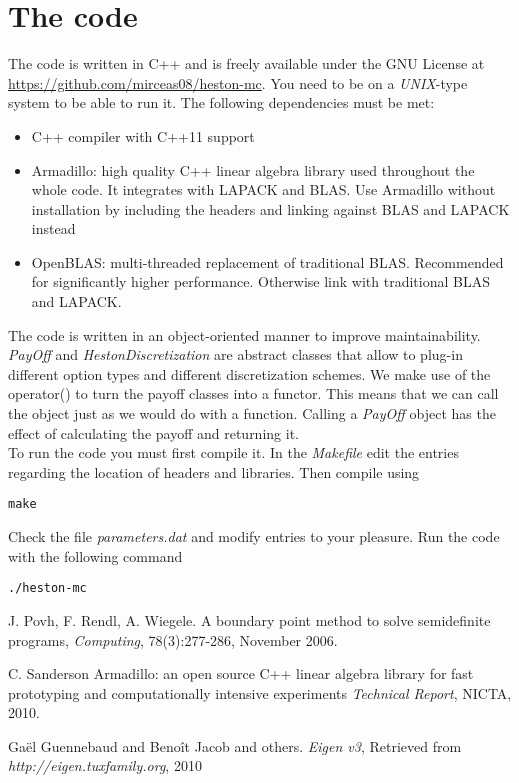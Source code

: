 \documentclass[12pt]{article}
\numberwithin{equation}{section}
\begin{document}
\section{The code} \label{code}
The code is written in C++ and is freely available under the GNU License at \url{https://github.com/mirceas08/heston-mc}. You need to be on a {\it UNIX}-type system to be able to run it. The following dependencies must be met:
\begin{itemize}
  \item C++ compiler with C++11 support
  \item Armadillo: high quality C++ linear algebra library used throughout the whole code. It integrates with LAPACK and BLAS. Use Armadillo without installation by including the headers and linking against BLAS and LAPACK instead
  \item OpenBLAS: multi-threaded replacement of traditional BLAS. Recommended for significantly higher performance. Otherwise link with traditional BLAS and LAPACK.
\end{itemize} 
The code is written in an object-oriented manner to improve maintainability. \textit{PayOff} and \textit{HestonDiscretization} are abstract classes that allow to plug-in different option types and different discretization schemes. We make use of the operator() to turn the payoff classes into a functor. This means that we can call the object just as we would do with a function. Calling a \textit{PayOff} object has the effect of calculating the payoff and returning it.\\
\newline
To run the code you must first compile it. In the \textit{Makefile} edit the entries regarding the location of headers and libraries. Then compile using
\begin{verbatim}
make
\end{verbatim}
Check the file \textit{parameters.dat} and modify entries to your pleasure. Run the code with the following command
\begin{verbatim}
./heston-mc
\end{verbatim}



\newpage

\begin{thebibliography}{9}
J. Povh, F. Rendl, A. Wiegele. 
A boundary point method to solve semidefinite programs,
\textit{Computing}, 78(3):277-286, November 2006.
 
C. Sanderson 
Armadillo: an open source C++ linear algebra library for fast prototyping and computationally intensive experiments
\textit{Technical Report}, NICTA, 2010.
 
Ga\"{e}l Guennebaud and Beno\^{i}t Jacob and others.
\textit{Eigen v3},
Retrieved from \textit{http://eigen.tuxfamily.org}, 2010
\end{thebibliography}
\end{document}
